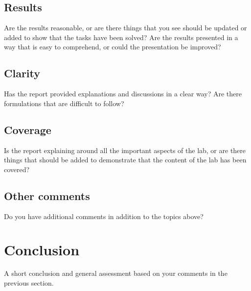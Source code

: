\documentclass[a4paper]{article}
\begin{document}
\subsection*{Results}
Are the results reasonable, or are there things that you see should be updated or added to show that the tasks have been solved? Are the results presented in a way that is easy to comprehend, or could the presentation be improved? 

\subsection*{Clarity}
Has the report provided explanations and discussions in a clear way? Are there formulations that are difficult to follow?

\subsection*{Coverage}
Is the report explaining around all the important aspects of the lab, or are there things that should be added to demonstrate that the content of the lab has been covered?

\subsection*{Other comments}
Do you have additional comments in addition to the topics above?

\section{Conclusion}
A short conclusion and general assessment based on your comments in the previous section.
\end{document}
